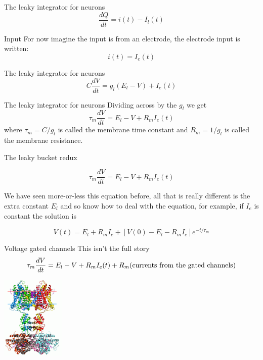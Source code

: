 \documentclass{beamer}
\newcommand{\crish}{\color{reddish}}
\newcommand{\cbla}{\color{black}}
\newcommand{\cred}{\color{red}}
\newcommand{\cblu}{\color{blue}}
\begin{document}
\begin{frame}{The leaky integrator for neurons}
  \crish
  $$\frac{dQ}{dt}=i(t)-I_l(t)$$
  \cbla
\end{frame}

\begin{frame}{Input}
  For now imagine the input is from an electrode, the electrode input is written:\crish
  $$i(t)=I_e(t)$$
  \cbla
\end{frame}

\begin{frame}{The leaky integrator for neurons}
  \crish
  $$C\frac{dV}{dt}=g_l(E_l-V)+I_e(t)$$
  \cbla
\end{frame}


\begin{frame}{The leaky integrator for neurons}
Dividing across by the \crish{}$g_l$\cbla{} we get
  \crish
  $$\tau_m\frac{dV}{dt}=E_l-V+R_mI_e(t)$$
  \cbla
  where \crish$\tau_m=C/g_l$\cbla{} is called the \cblu{}membrane time constant\cbla{} and \crish{}$R_m=1/g_l$\cbla{} is called the \cblu{} membrane resistance\cbla{}.

\end{frame}

\begin{frame}{The leaky bucket redux}

  \crish
  $$\tau_m\frac{dV}{dt}=E_l-V+R_mI_e(t)$$
  \cbla

  We have seen more-or-less this equation before, all that is really
  different is the extra constant \crish$E_l$\cbla{} and so know how to
  deal with the equation, for example, if \crish{}$I_e$\cbla{} is constant the
  solution is\crish

  $$V(t)=E_l+R_mI_e+[V(0)-E_l-R_mI_e]e^{-t/\tau_m}$$
  \cbla{}
  
\end{frame}

\begin{frame}{Voltage gated channels}
  This isn't the full story
  \crish$$\tau_m\frac{dV}{dt}=E_l-V+R_mI_e(t)+R_m(\cred{}\mbox{currents from the gated channels}\crish)$$\cbla{}
  \begin{center}
    \includegraphics[height=4cm]{2r9r_opm.png}
\end{center}
    \vfill
  \end{frame}
\end{document}
